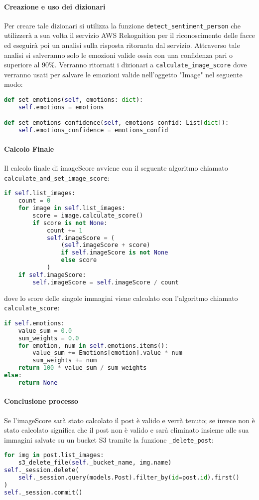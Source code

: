 \paragraph{Creazione e uso dei dizionari} \aCapo{}
Per creare tale dizionari si utilizza la funzione \verb+detect_sentiment_person+ che utilizzerà a sua volta il servizio AWS Rekognition per il riconoscimento delle facce ed eseguirà poi un analisi sulla risposta ritornata dal servizio. Attraverso tale analisi si salveranno solo le emozioni valide ossia con una confidenza pari o superiore al 90\%. Verranno ritornati i dizionari a \verb+calculate_image_score+ dove verranno usati per salvare le emozioni valide nell'oggetto "Image" nel seguente modo:
\begin{lstlisting}[language=Python]
def set_emotions(self, emotions: dict):
    self.emotions = emotions

def set_emotions_confidence(self, emotions_confid: List[dict]):
    self.emotions_confidence = emotions_confid
\end{lstlisting}
\paragraph{Calcolo Finale} \aCapo{}
Il calcolo finale di imageScore avviene con il seguente algoritmo chiamato \verb+calculate_and_set_image_score+: 
\begin{lstlisting}[language=Python]
if self.list_images:
    count = 0
    for image in self.list_images:
        score = image.calculate_score()
        if score is not None:
            count += 1
            self.imageScore = (
                (self.imageScore + score)
                if self.imageScore is not None
                else score
            )
    if self.imageScore:
        self.imageScore = self.imageScore / count
\end{lstlisting}
dove lo score delle singole immagini viene calcolato con l'algoritmo chiamato \verb+calculate_score+:
\begin{lstlisting}[language=Python]
if self.emotions:
    value_sum = 0.0
    sum_weights = 0.0
    for emotion, num in self.emotions.items():
        value_sum += Emotions[emotion].value * num
        sum_weights += num
    return 100 * value_sum / sum_weights
else:
    return None
\end{lstlisting}
\paragraph{Conclusione processo} \aCapo{}
Se l'imageScore sarà stato calcolato il post è valido e verrà tenuto; se invece non è stato calcolato significa che il post non è valido e sarà eliminato insieme alle sua immagini salvate su un bucket S3 tramite la funzione \verb+_delete_post+:
\begin{lstlisting}[language=Python]
for img in post.list_images:
    s3_delete_file(self._bucket_name, img.name)
self._session.delete(
    self._session.query(models.Post).filter_by(id=post.id).first()
)
self._session.commit()
\end{lstlisting}
